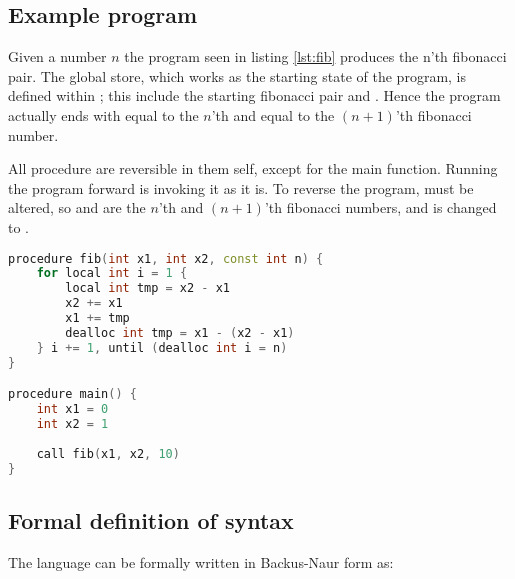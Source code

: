 \subsection*{Example program \rr}
Given a number $n$ the program seen in listing \ref{lst:fib} produces the n'th fibonacci
pair. The global store, which works as the starting state of the program, is defined within
; this include the starting fibonacci pair
 and . Hence the program actually ends with  equal to the $n$'th
and  equal to the $(n+1)$'th fibonacci number.

All \lan procedure are reversible in them self, except for the main function. Running the program
forward is invoking it as it is. To reverse the program,  must be altered, so
 and  are the $n$'th and $(n+1)$'th fibonacci numbers, and
 is changed to .

\begin{lstlisting}[language=C++, label={lst:fib}, caption={Program finding the \lsin{n}'th fibonacci number.}]
procedure fib(int x1, int x2, const int n) {
    for local int i = 1 {
        local int tmp = x2 - x1
        x2 += x1
        x1 += tmp
        dealloc int tmp = x1 - (x2 - x1)
    } i += 1, until (dealloc int i = n)
}

procedure main() {
    int x1 = 0
    int x2 = 1
    
    call fib(x1, x2, 10)
}
\end{lstlisting}


\subsection{Formal definition of syntax \rr}
The language \lan can be formally written in Backus-Naur form as:

